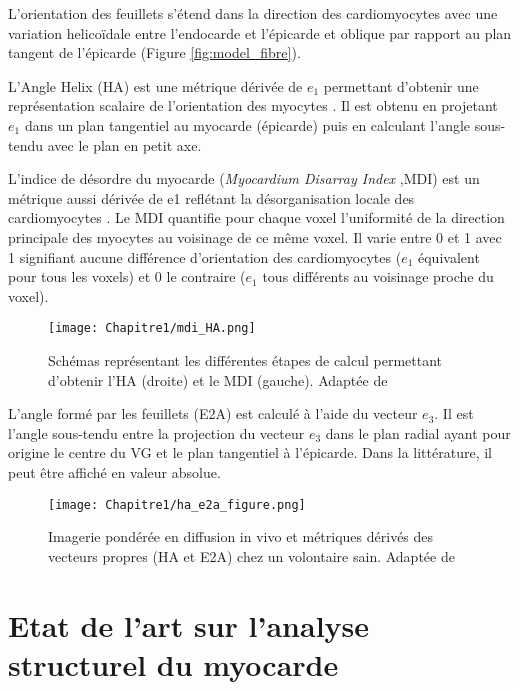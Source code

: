 L’orientation des feuillets s’étend dans la direction des cardiomyocytes avec une variation helicoïdale entre l’endocarde et l’épicarde et oblique par rapport au plan tangent de l’épicarde (Figure \ref{fig:model_fibre}).

L’Angle Helix (HA) est une métrique dérivée de $e_1$ permettant d’obtenir une représentation scalaire de l’orientation des myocytes \cite{Ferreira2013}. Il est obtenu en projetant $e_1$ dans un plan tangentiel au myocarde (épicarde) puis en calculant l’angle sous-tendu avec le plan en petit axe.

L’indice de désordre du myocarde (\textit{Myocardium Disarray Index} ,MDI) est un métrique aussi dérivée de e1 reflétant la désorganisation locale des cardiomyocytes \cite{Wu2004} \cite{GarciaCanadilla2019}. Le MDI quantifie pour chaque voxel l’uniformité de la direction principale des myocytes au voisinage de ce même voxel. Il varie entre 0 et 1 avec 1 signifiant aucune différence d’orientation des cardiomyocytes ($e_1$ équivalent pour tous les voxels) et 0 le contraire ($e_1$ tous différents au voisinage proche du voxel).
\begin{figure}[!h]
\begin{center}
  \texttt{[image: Chapitre1/mdi\_HA.png]}
   \end{center}
  \caption{Schémas représentant les différentes étapes de calcul permettant d’obtenir l’HA (droite) et le MDI (gauche). Adaptée de \cite{Ferreira2013}}
\label{fig:dti_HA_mdi}
\end{figure}

L’angle formé par les feuillets (E2A) est calculé à l’aide du vecteur $e_3$. Il est l’angle sous-tendu entre la projection du vecteur $e_3$ dans le plan radial ayant pour origine le centre du VG et le plan tangentiel à l’épicarde\cite{Dou2002}. Dans la littérature, il peut être affiché en valeur absolue.

\begin{figure}[!h]
\begin{center}
  \texttt{[image: Chapitre1/ha\_e2a\_figure.png]}
   \end{center}
  \caption{Imagerie pondérée en diffusion in vivo et métriques dérivés des vecteurs propres (HA et E2A) chez un volontaire sain. Adaptée de \cite{Ferreira2014}}
\label{fig:dti_e2A}
\end{figure}
\clearpage
\section{Etat de l’art sur l’analyse structurel du myocarde}

